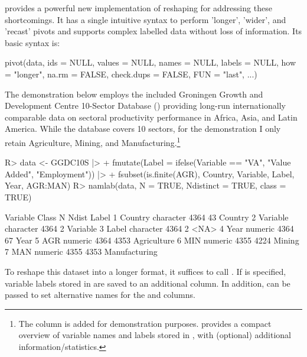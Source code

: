 \documentclass[article]{jss} %
\newcommand{\fct}[1]{\code{#1()}}
\begin{document}
\fct{collapse::pivot} provides a powerful new implementation of reshaping for  addressing these shortcomings. It has a single intuitive syntax to perform 'longer', 'wider', and 'recast' pivots and supports complex labelled data without loss of information. Its basic syntax is: \newpage
%
\begin{Code}
pivot(data, ids = NULL, values = NULL, names = NULL, labels = NULL,
  how = "longer", na.rm = FALSE, check.dups = FALSE, FUN = "last", ...)
\end{Code}
%
The demonstration below employs the included Groningen Growth and Development Centre 10-Sector Database (\href{https://sebkrantz.github.io/collapse/reference/GGDC10S.html}{}) providing long-run internationally comparable data on sectoral productivity performance in Africa, Asia, and Latin America. While the database covers 10 sectors, for the demonstration I only retain Agriculture, Mining, and Manufacturing.\footnote{The  column is added for demonstration purposes. \fct{namlab} provides a compact overview of variable names and labels stored in , with (optional) additional information/statistics.}
%
\begin{Schunk}
\begin{Sinput}
R> data <- GGDC10S |>
+   fmutate(Label = ifelse(Variable == "VA", "Value Added", "Employment")) |>
+   fsubset(is.finite(AGR), Country, Variable, Label, Year, AGR:MAN)
R> namlab(data, N = TRUE, Ndistinct = TRUE, class = TRUE)
\end{Sinput}
\begin{Soutput}
  Variable     Class    N Ndist         Label
1  Country character 4364    43       Country
2 Variable character 4364     2      Variable
3    Label character 4364     2          <NA>
4     Year   numeric 4364    67          Year
5      AGR   numeric 4364  4353   Agriculture
6      MIN   numeric 4355  4224        Mining
7      MAN   numeric 4355  4353 Manufacturing
\end{Soutput}
\end{Schunk}
%
To reshape this dataset into a longer format, it suffices to call . If  is specified, variable labels stored in  are saved to an additional column. In addition,  can be passed to set alternative names for the  and  columns.
%
\end{document}
